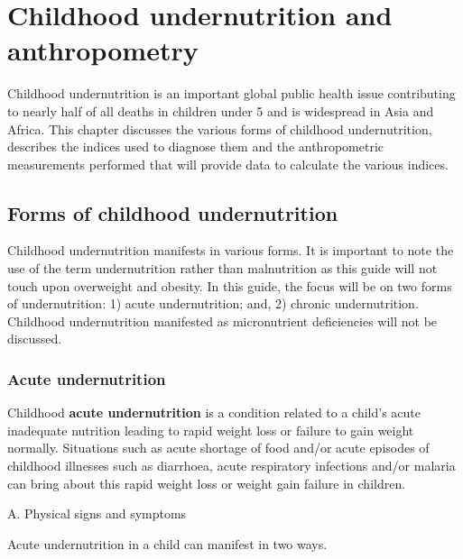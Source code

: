 \documentclass[12pt,]{book}
\theoremstyle{definition}
\theoremstyle{definition}
\theoremstyle{definition}
\theoremstyle{remark}
\begin{document}
\hypertarget{anthro}{%
\chapter{Childhood undernutrition and anthropometry}\label{anthro}}

Childhood undernutrition is an important global public health issue
contributing to nearly half of all deaths in children under 5 and is
widespread in Asia and Africa. This chapter discusses the various forms
of childhood undernutrition, describes the indices used to diagnose them
and the anthropometric measurements performed that will provide data to
calculate the various indices.

\hypertarget{forms-of-childhood-undernutrition}{%
\section{Forms of childhood
undernutrition}\label{forms-of-childhood-undernutrition}}

Childhood undernutrition manifests in various forms. It is important to
note the use of the term undernutrition rather than malnutrition as this
guide will not touch upon overweight and obesity. In this guide, the
focus will be on two forms of undernutrition: 1) acute undernutrition;
and, 2) chronic undernutrition. Childhood undernutrition manifested as
micronutrient deficiencies will not be discussed.

\hypertarget{acute-undernutrition}{%
\subsection{Acute undernutrition}\label{acute-undernutrition}}

Childhood \textbf{acute undernutrition} is a condition related to a
child's acute inadequate nutrition leading to rapid weight loss or
failure to gain weight normally. Situations such as acute shortage of
food and/or acute episodes of childhood illnesses such as diarrhoea,
acute respiratory infections and/or malaria can bring about this rapid
weight loss or weight gain failure in children.

\newpage

A. Physical signs and symptoms

Acute undernutrition in a child can manifest in two ways.
\end{document}
